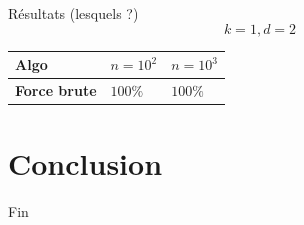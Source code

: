 \documentclass[10pt,xcolor={x11names}]{beamer}
\begin{document}
\begin{frame}{Résultats (lesquels ?)}
	$$
	k=1, d=2
	$$
	\begin{center}\begin{tabular}{ |m{8em}|m{3.5em}|m{3.5em}| }
		\hline
		Algo & $n=10^2$ & $n=10^3$\\
		\hline
		\textbf{Force brute} & $100\%$ & $100\%$ \\
		\hline
	\end{tabular}\end{center}
\end{frame}

\section{Conclusion}

\begin{frame}[standout]
	Fin
\end{frame}
\end{document}
